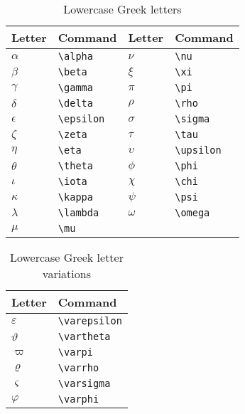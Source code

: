 \begin{table}
  \centering
  \caption{Lowercase Greek letters}
  \label{tab:lowercase-greek-1}
  \begin{tabular}{@{}llll@{}}
    \toprule
    Letter & Command & Letter & Command \\
    \midrule
    $\alpha$ & \verb|\alpha| & $\nu$ & \verb|\nu| \\
    $\beta$ & \verb|\beta| & $\xi$ & \verb|\xi| \\
    $\gamma$ & \verb|\gamma| & $\pi$ & \verb|\pi| \\
    $\delta$ & \verb|\delta| & $\rho$ & \verb|\rho| \\
    $\epsilon$ & \verb|\epsilon| & $\sigma$ & \verb|\sigma|
    \\
    $\zeta$ & \verb|\zeta| & $\tau$ & \verb|\tau| \\
    $\eta$ & \verb|\eta| & $\upsilon$ & \verb|\upsilon| \\
    $\theta$ & \verb|\theta| & $\phi$ & \verb|\phi| \\
    $\iota$ & \verb|\iota| & $\chi$ & \verb|\chi| \\
    $\kappa$ & \verb|\kappa| & $\psi$ & \verb|\psi| \\
    $\lambda$ & \verb|\lambda| & $\omega$ & \verb|\omega| \\
    $\mu$ & \verb|\mu| & & \\
    \bottomrule
  \end{tabular}
\end{table}

\begin{table}
  \centering
  \caption{Lowercase Greek letter variations}
  \label{tab:lower-greek-var}
  \begin{tabular}{@{}ll@{}}
    \toprule
    Letter & Command \\
    \midrule
    $\varepsilon$ & \verb|\varepsilon| \\
    $\vartheta$ & \verb|\vartheta| \\
    $\varpi$ & \verb|\varpi| \\
    $\varrho$ & \verb|\varrho| \\
    $\varsigma$ & \verb|\varsigma| \\
    $\varphi$ & \verb|\varphi| \\
    \bottomrule
  \end{tabular}  
\end{table}

